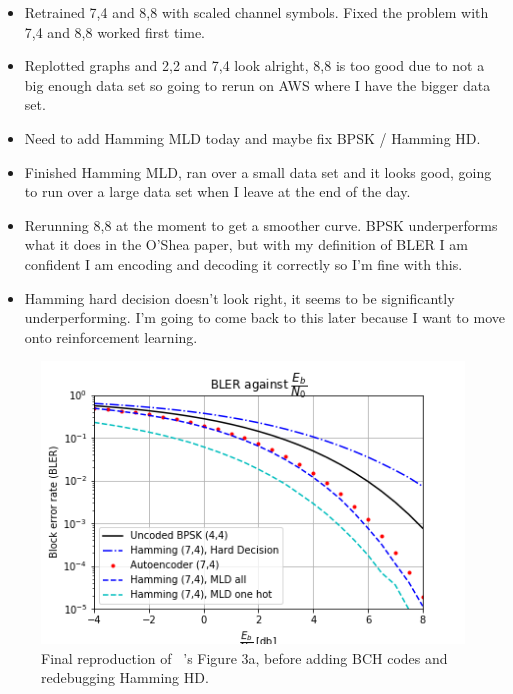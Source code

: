 \documentclass[12pt,onecolumn,letterpaper]{article}
\begin{document}
\begin{itemize}
   \item Retrained 7,4 and 8,8 with scaled channel symbols. Fixed the problem with 7,4 and 8,8 worked first time.
   \item Replotted graphs and 2,2 and 7,4 look alright, 8,8 is too good due to not a big enough data set so going to rerun on AWS where I have the bigger data set.
   \item Need to add Hamming MLD today and maybe fix BPSK / Hamming HD.
   \item Finished Hamming MLD, ran over a small data set and it looks good, going to run over a large data set when I leave at the end of the day.
   \item Rerunning 8,8 at the moment to get a smoother curve. BPSK underperforms what it does in the O'Shea paper, but with my definition of BLER I am confident I am encoding and decoding it correctly so I'm fine with this.
   \item Hamming hard decision doesn't look right, it seems to be significantly underperforming. I'm going to come back to this later because I want to move onto reinforcement learning.
\end{itemize}

\begin{figure}[t]
   \begin{center}
      \includegraphics[width=0.8\linewidth]{figures/o_shea_3a_bler_vs_eb.png}
   \end{center}
      \caption{Final reproduction of ~\cite{oShea}'s Figure 3a, before adding BCH codes and redebugging Hamming HD.}
   \label{fig:OSheaFigure3a}
\end{figure}
\end{document}
